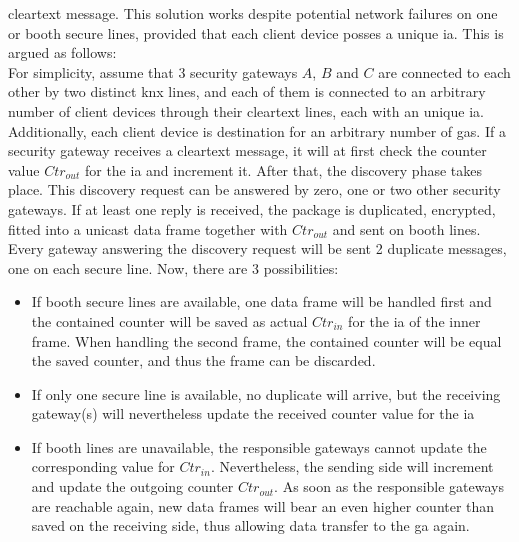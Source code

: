 cleartext message. This solution works despite potential network failures on one or booth secure lines, provided that each client device posses a unique
\gls{ia}. This is argued as follows:
\\
For simplicity, assume that 3 security gateways $A$, $B$ and $C$ are connected to each other by two distinct \gls{knx} lines, and each of them is connected
to an arbitrary number of client devices through their cleartext lines, each with an unique \gls{ia}.
Additionally, each client device is destination for an arbitrary number of \glspl{ga}.
If a security gateway receives a cleartext message, it will at first check the counter value $Ctr_{out}$ for the \gls{ia} and increment it. After that, the 
discovery phase takes place. This discovery request can be answered by zero, one or two other security gateways. If at least one reply is received, the package
is duplicated, encrypted, fitted into a unicast data frame together with $Ctr_{out}$ and sent on booth lines.
\\
Every gateway answering the discovery request will be sent 2 duplicate messages, one on each secure line. Now, there are 3 possibilities:
\begin{itemize}
 \item If booth secure lines are available, one data frame will be handled first and the contained counter will be saved as actual $Ctr_{in}$ for the \gls{ia}
 of the inner frame. When handling the second frame, the contained counter will be equal the saved counter, and thus the frame can be discarded.
 \item If only one secure line is available, no duplicate will arrive, but the receiving gateway(s) will nevertheless update the received counter value for the
 \gls{ia}
 \item If booth lines are unavailable, the responsible gateways cannot update the corresponding value for $Ctr_{in}$. Nevertheless, the sending side will 
 increment and update
 the outgoing counter $Ctr_{out}$. As soon as the responsible gateways are reachable again, new data frames will bear an even higher counter than saved on the
 receiving side, thus allowing data transfer to the \gls{ga} again.
\end{itemize}



